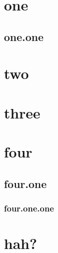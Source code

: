 \documentclass{article}
\begin{document}
\tableofcontents
\section{one}
\subsection{one.one}
\section{two}
\section{three}
\section{four}
\subsection{four.one}
\subsubsection{four.one.one}
\section{hah?}
\end{document}
